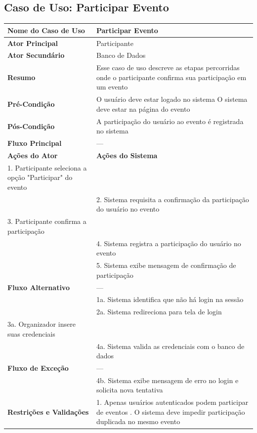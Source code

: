\documentclass[12pt,a4paper]{article}
\begin{document}
\subsection{Caso de Uso: Participar Evento}
\begin{longtable}{|p{4cm}|p{11cm}|}
\hline
\textbf{Nome do Caso de Uso} & Participar Evento \\ \hline
\textbf{Ator Principal} & Participante \\ \hline
\textbf{Ator Secundário} & Banco de Dados \\ \hline
\textbf{Resumo} & Esse caso de uso descreve as etapas percorridas onde o participante confirma sua participação em um evento \\ \hline
\textbf{Pré-Condição} & O usuário deve estar logado no sistema \newline O sistema deve estar na página do evento \\ \hline
\textbf{Pós-Condição} & A participação do usuário ao evento é registrada no sistema \\ \hline
\textbf{Fluxo Principal} & --- \\ \hline
\textbf{Ações do Ator} & \textbf{Ações do Sistema} \\ \hline
1. Participante seleciona a opção "Participar" do evento & \\ \hline
& 2. Sistema requisita a confirmação da participação do usuário no evento \\ \hline
3. Participante confirma a participação & \\ \hline
& 4. Sistema registra a participação do usuário no evento \\ \hline
& 5. Sistema exibe mensagem de confirmação de participação \\ \hline
\textbf{Fluxo Alternativo} & --- \\ \hline
& 1a. Sistema identifica que não há login na sessão \\ \hline
& 2a. Sistema redireciona para tela de login \\ \hline
3a. Organizador insere suas credenciais & \\ \hline
& 4a. Sistema valida as credenciais com o banco de dados \\ \hline
\textbf{Fluxo de Exceção} & --- \\ \hline
& 4b. Sistema exibe mensagem de erro no login e solicita nova tentativa \\ \hline
\textbf{Restrições e Validações} & 1. Apenas usuários autenticados podem participar de eventos \newline 2. O sistema deve impedir participação duplicada no mesmo evento \\ \hline
\end{longtable}
\end{document}
